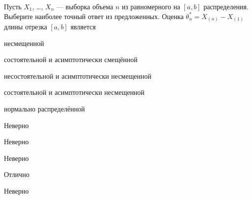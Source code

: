 
\begin{question}
Пусть \(X_1\), \ldots, \(X_n\) --- выборка объема \(n\) из равномерного
на \([a, b]\) распределения. Выберите наиболее точный ответ из
предложенных. Оценка \(\theta^*_n = X_{(n)}-X_{(1)}\) длины отрезка
\([a,b]\) является
\begin{answerlist}
  \item несмещенной
  \item состоятельной и асимптотически смещённой
  \item несостоятельной и асимптотически несмещенной
  \item состоятельной и асимптотически несмещенной
  \item нормально распределённой
\end{answerlist}
\end{question}

\begin{solution}
\begin{answerlist}
  \item Неверно
  \item Неверно
  \item Неверно
  \item Отлично
  \item Неверно
\end{answerlist}
\end{solution}

